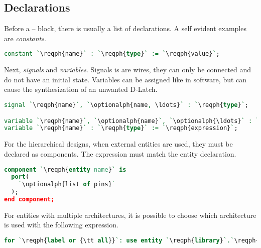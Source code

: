\subsection{Declarations} \label{sec:vhdl:declarations}
Before a  --  block, there is usually a list of declarations.
A self evident examples are \emph{constants}.
\begin{lstlisting}[language=vhdl]
constant `\reqph{name}` : `\reqph{type}` := `\reqph{value}`;
\end{lstlisting}

Next, \emph{signals} and \emph{variables}. Signals is are wires, they can only be
connected and do not have an initial state. Variables can be assigned like in
software, but can cause the synthesization of an unwanted D-Latch.

\begin{lstlisting}[language=vhdl]
signal `\reqph{name}`, `\optionalph{name, \ldots}` : `\reqph{type}`;

variable `\reqph{name}`, `\optionalph{name}`, `\optionalph{\ldots}` : `\reqph{type}`;
variable `\reqph{name}` : `\reqph{type}` := `\reqph{expression}`;
\end{lstlisting}

For the hierarchical designs, when external entities are used, they must be
declared as components. The  expression must match the entity
declaration.
\begin{lstlisting}[language=vhdl]
component `\reqph{entity name}` is
  port(
    `\optionalph{list of pins}`
  );
end component;
\end{lstlisting}
For entities with multiple architectures, it is possible to choose which
architecture is used with the following expression.
\begin{lstlisting}[language=vhdl]
for `\reqph{label or {\tt all}}`: use entity `\reqph{library}`.`\reqph{entity}`(`\reqph{architecture}`);
\end{lstlisting}

